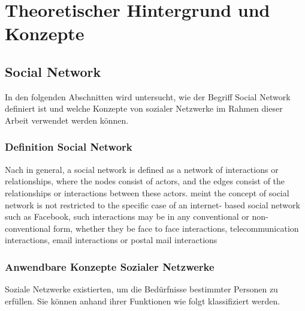 
\chapter{Theoretischer Hintergrund und Konzepte}
\label{theoretischer-hintergrund}


\section{Social Network}

In den folgenden Abschnitten wird untersucht, wie der Begriff Social Network definiert ist und welche Konzepte von sozialer Netzwerke im Rahmen dieser Arbeit verwendet werden können.


\subsection{Definition Social Network}


Nach \textcite[S. 2]{aggarwal:sn} \glqq in general, a social network is defined as a network of interactions or relationships, where the nodes consist of actors, and the edges consist of the relationships or interactions between these actors.\grqq \textcite{aggarwal:sn} meint \glqq the concept of social network is not restricted to the specific case of an internet- based social network such as Facebook, such interactions may be in any conventional or non-conventional form, whether they be face to face interactions, telecommunication interactions, email interactions or postal mail interactions\grqq


\subsection{Anwendbare Konzepte Sozialer Netzwerke}

Soziale Netzwerke existierten, um die Bedürfnisse bestimmter Personen zu erfüllen. Sie können anhand ihrer Funktionen wie folgt klassifiziert werden.

